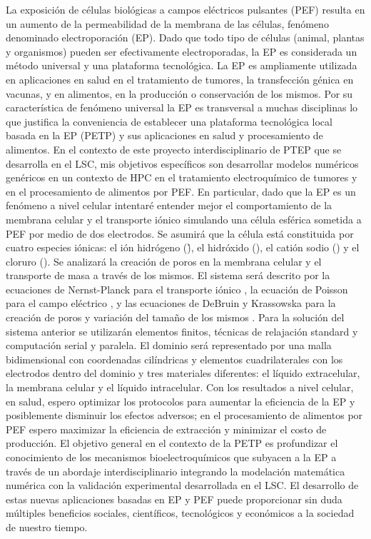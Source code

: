 \documentclass[a4paper,spanish]{article}
\begin{document}
La exposición de células biológicas a campos eléctricos pulsantes (PEF) resulta en un aumento de la permeabilidad de la membrana de las células, fenómeno denominado electroporación (EP). Dado que todo tipo de células (animal, plantas y organismos) pueden ser efectivamente electroporadas, la EP es considerada un método universal y una plataforma tecnológica. La EP es ampliamente utilizada en aplicaciones en salud en el tratamiento de tumores,  la transfección génica en vacunas, y en alimentos, en la producción o conservación de los mismos. Por su característica de fenómeno universal la EP es transversal a muchas disciplinas lo que justifica la conveniencia de establecer una plataforma tecnológica local basada en la EP (PETP) y sus aplicaciones en salud y procesamiento de alimentos. En el contexto de este proyecto interdisciplinario de PTEP que se desarrolla en el LSC, mis objetivos específicos son desarrollar modelos numéricos genéricos en un contexto de HPC en el tratamiento electroquímico de tumores y en el procesamiento de alimentos por PEF.  En particular, dado que la EP es un fenómeno a nivel celular intentaré entender mejor el comportamiento de la membrana celular y el transporte iónico simulando una célula esférica sometida a PEF por medio de dos electrodos. Se asumirá que la célula está constituida  por cuatro especies iónicas: el ión hidrógeno (\h), el hidróxido (\oh), el catión sodio (\na) y el cloruro (\cl). Se  analizará la creación de poros en la membrana celular y el transporte de masa a través de los mismos. El sistema será descrito por la ecuaciones de Nernst-Planck para el transporte iónico \cite{fodava}, la ecuación de Poisson para el campo eléctrico \cite{jianbo}, y las ecuaciones de DeBruin y Krassowska para la creación de poros y variación del tamaño de los mismos \cite{krass}. Para la solución del sistema anterior se utilizarán elementos finitos, técnicas de relajación standard y computación serial y paralela. El dominio será representado por una malla bidimensional con coordenadas cilíndricas y elementos cuadrilaterales con los electrodos dentro del dominio y tres materiales diferentes: el líquido extracelular, la membrana celular y el líquido intracelular. Con los resultados a nivel celular, en salud, espero optimizar los protocolos para aumentar la eficiencia de la EP y posiblemente disminuir los efectos adversos; en el procesamiento de alimentos por PEF espero maximizar la eficiencia de extracción y minimizar el costo de producción. El objetivo general en el contexto de la PETP es profundizar el conocimiento de los mecanismos bioelectroquímicos que subyacen a la EP a través de un abordaje interdisciplinario integrando la modelación matemática numérica con la validación experimental desarrollada en el LSC. El desarrollo de estas nuevas aplicaciones basadas en EP y PEF puede proporcionar sin duda múltiples beneficios sociales, científicos, tecnológicos y económicos a la sociedad de nuestro tiempo. 
\end{document}
